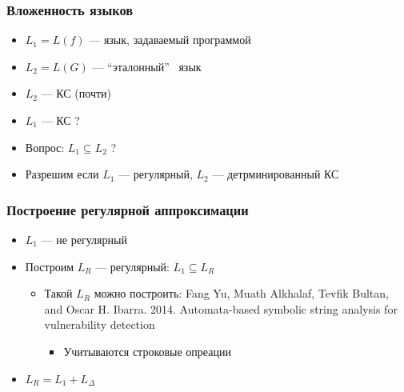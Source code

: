 \documentclass{beamer}
\begin{document}
\begin{frame}[fragile]
	\transwipe[direction=90]
	\frametitle{Вложенность языков}
	\begin{itemize}
	    \item $L_1 = L(f)$ --- язык, задаваемый программой
	    \item $L_2 = L(G)$ --- ``эталонный'' \ язык
	    \item $L_2$ --- КС (почти)
	    \item $L_1$ --- КС ?
	    \item Вопрос: $L_1 \subseteq L_2$ ?
	    \item Разрешим если  $L_1$ --- регулярный, $L_2$ --- детрминированный КС
    \end{itemize}
\end{frame}


\begin{frame}[fragile]
	\transwipe[direction=90]
	\frametitle{Построение регулярной аппроксимации}
	\begin{itemize}
	    \item $L_1$ --- не регулярный
	    \item Построим $L_R$ --- регулярный: $L_1 \subseteq L_R$
    	\begin{itemize}
    	  \item Такой $L_R$ можно построить: Fang Yu, Muath Alkhalaf, Tevfik Bultan, and Oscar H. Ibarra. 2014. Automata-based symbolic string analysis for vulnerability detection
    	\begin{itemize}
    		\item Учитываются строковые опреации
      \end{itemize}
      \end{itemize}
      \item $L_R = L_1 + L_{\Delta}$
    \end{itemize}
\end{frame}
\end{document}

